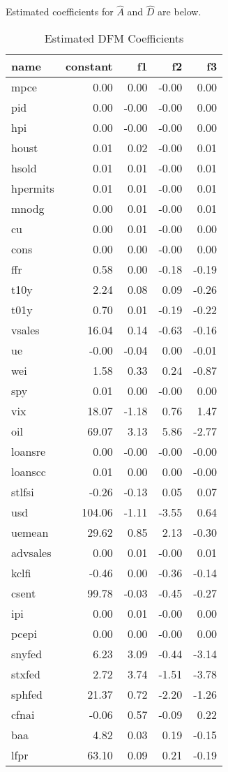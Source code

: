 \documentclass[11pt, letterpaper]{article}\usepackage[]{graphicx}\usepackage[]{color}
\begin{document}
Estimated coefficients for $\widehat{A}$ and $\widehat{D}$ are below.
\begin{table}[H]
\centering
\begingroup\footnotesize
\begin{tabular}{lrrrr}
  \hline
name & constant & f1 & f2 & f3 \\ 
  \hline
mpce & 0.00 & 0.00 & -0.00 & 0.00 \\ 
  pid & 0.00 & -0.00 & -0.00 & 0.00 \\ 
  hpi & 0.00 & -0.00 & -0.00 & 0.00 \\ 
  houst & 0.01 & 0.02 & -0.00 & 0.01 \\ 
  hsold & 0.01 & 0.01 & -0.00 & 0.01 \\ 
  hpermits & 0.01 & 0.01 & -0.00 & 0.01 \\ 
  mnodg & 0.00 & 0.01 & -0.00 & 0.01 \\ 
  cu & 0.00 & 0.01 & -0.00 & 0.00 \\ 
  cons & 0.00 & 0.00 & -0.00 & 0.00 \\ 
  ffr & 0.58 & 0.00 & -0.18 & -0.19 \\ 
  t10y & 2.24 & 0.08 & 0.09 & -0.26 \\ 
  t01y & 0.70 & 0.01 & -0.19 & -0.22 \\ 
  vsales & 16.04 & 0.14 & -0.63 & -0.16 \\ 
  ue & -0.00 & -0.04 & 0.00 & -0.01 \\ 
  wei & 1.58 & 0.33 & 0.24 & -0.87 \\ 
  spy & 0.01 & 0.00 & -0.00 & 0.00 \\ 
  vix & 18.07 & -1.18 & 0.76 & 1.47 \\ 
  oil & 69.07 & 3.13 & 5.86 & -2.77 \\ 
  loansre & 0.00 & -0.00 & -0.00 & -0.00 \\ 
  loanscc & 0.01 & 0.00 & 0.00 & -0.00 \\ 
  stlfsi & -0.26 & -0.13 & 0.05 & 0.07 \\ 
  usd & 104.06 & -1.11 & -3.55 & 0.64 \\ 
  uemean & 29.62 & 0.85 & 2.13 & -0.30 \\ 
  advsales & 0.00 & 0.01 & -0.00 & 0.01 \\ 
  kclfi & -0.46 & 0.00 & -0.36 & -0.14 \\ 
  csent & 99.78 & -0.03 & -0.45 & -0.27 \\ 
  ipi & 0.00 & 0.01 & -0.00 & 0.00 \\ 
  pcepi & 0.00 & 0.00 & -0.00 & 0.00 \\ 
  snyfed & 6.23 & 3.09 & -0.44 & -3.14 \\ 
  stxfed & 2.72 & 3.74 & -1.51 & -3.78 \\ 
  sphfed & 21.37 & 0.72 & -2.20 & -1.26 \\ 
  cfnai & -0.06 & 0.57 & -0.09 & 0.22 \\ 
  baa & 4.82 & 0.03 & 0.19 & -0.15 \\ 
  lfpr & 63.10 & 0.09 & 0.21 & -0.19 \\ 
   \hline
\end{tabular}
\endgroup
\caption{Estimated DFM Coefficients} 
\end{table}
\end{document}

